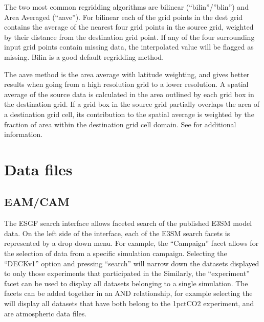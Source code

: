 \documentclass[letterpaper,10pt,english]{sphinxmanual}
\begin{document}
The two most common regridding algorithms are bi\sphinxhyphen{}linear (“bilin”/”blin”) and Area Averaged (“aave”). For bi\sphinxhyphen{}linear each of the grid points in the dest grid contains the
average of the nearest four grid points in the source grid, weighted by their distance from the destination grid point.
If any of the four surrounding input grid points contain missing data, the interpolated value will be flagged as missing. Bilin is a good default regridding method.

The aave method is the area average with latitude weighting, and gives better results when going from a high resolution grid to a lower resolution.
A spatial average of the source data is calculated in the area outlined by each grid box in the destination grid.
If a grid box in the source grid partially overlaps the area of a destination grid cell, its contribution to the spatial average is weighted by the fraction of area within the destination grid cell domain.
See  for additional information.


\section{Data files}
\label{\detokenize{guide:data-files}}

\subsection{EAM/CAM}
\label{\detokenize{guide:eam-cam}}
 The ESGF search interface allows faceted search of the published E3SM model data.
On the left side of the interface, each of the E3SM search facets is represented by a drop down menu. For example, the “Campaign” facet allows for the selection of data from a specific
simulation campaign. Selecting the “DECK\sphinxhyphen{}v1” option and pressing “search” will narrow down the datasets displayed to only those experiments that participated in the 
Similarly, the “experiment” facet can be used to display all datasets belonging to a single simulation. The facets can be added together in an AND relationship, for example selecting the 
will display all datasets that have both belong to the 1pctCO2 experiment, and are atmospheric data files.
\end{document}
